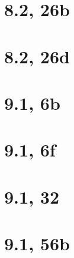 \documentclass{article}
\begin{document}
\section{8.2, 26b}

\section{8.2, 26d}

\section{9.1, 6b}

\section{9.1, 6f}

\section{9.1, 32}

\section{9.1, 56b}
\end{document}
